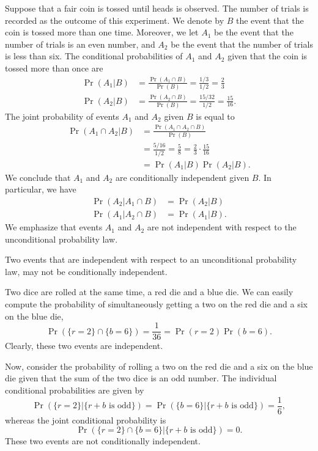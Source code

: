 \begin{example}
Suppose that a fair coin is tossed until heads is observed.
The number of trials is recorded as the outcome of this experiment.
We denote by $B$ the event that the coin is tossed more than one time.
Moreover, we let $A_1$ be the event that the number of trials is an even number, and $A_2$ be the event that the number of trials is less than six.
The conditional probabilities of $A_1$ and $A_2$ given that the coin is tossed more than once are
\begin{align*}
\Pr (A_1 | B) &= \frac{ \Pr (A_1 \cap B) }{ \Pr (B) }
= \frac{1/3}{1/2} = \frac{2}{3} \\
\Pr (A_2 | B) &= \frac{ \Pr (A_2 \cap B) }{ \Pr (B) }
= \frac{15/32}{1/2} = \frac{15}{16} .
\end{align*}
The joint probability of events $A_1$ and $A_2$ given $B$ is equal to
\begin{equation*}
\begin{split}
\Pr (A_1 \cap A_2 | B) &= \frac{ \Pr (A_1 \cap A_2 \cap B) }{ \Pr (B) } \\
&= \frac{5/16}{1/2} = \frac{5}{8} = \frac{2}{3} \cdot \frac{15}{16} \\
&= \Pr (A_1 | B) \Pr (A_2 | B) .
\end{split}
\end{equation*}
We conclude that $A_1$ and $A_2$ are conditionally independent given $B$.
In particular, we have
\begin{align*}
\Pr (A_2 | A_1 \cap  B) &= \Pr (A_2 | B) \\
\Pr (A_1 | A_2 \cap  B) &= \Pr (A_1 | B) .
\end{align*}
We emphasize that events $A_1$ and $A_2$ are not independent with respect to the unconditional probability law.
\end{example}

Two events that are independent with respect to an unconditional probability law, may not be conditionally independent.

\begin{example}
Two dice are rolled at the same time, a red die and a blue die.
We can easily compute the probability of simultaneously getting a two on the red die and a six on the blue die,
\begin{equation*}
\Pr (\{ r=2 \} \cap \{ b=6 \}) = \frac{1}{36}
= \Pr ( r=2 ) \Pr ( b=6 ) .
\end{equation*}
Clearly, these two events are independent.

Now, consider the probability of rolling a two on the red die and a six on the blue die given that the sum of the two dice is an odd number.
The individual conditional probabilities are given by
\begin{equation*}
\Pr (\{ r=2 \} | \{ r+b \text{ is odd} \})
= \Pr (\{ b=6 \} | \{ r+b \text{ is odd} \})
= \frac{1}{6},
\end{equation*}
whereas the joint conditional probability is
\begin{equation*}
\Pr (\{ r=2 \} \cap \{ b=6 \} | \{ r+b \text{ is odd} \})
= 0 .
\end{equation*}
These two events are not conditionally independent.
\end{example}

